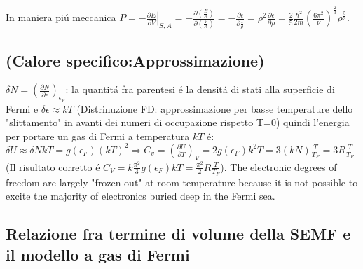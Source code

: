 In maniera pi\'u meccanica $P=-\left.\frac{\partial E}{\partial V} \right|_{S,A}=-\frac{\partial (\frac{E}{A})}{\partial (\frac{V}{A})}=-\frac{\partial \epsilon}{\partial \frac{1}{\rho}}=\rho^2 \frac{\partial \epsilon}{\partial \rho}=\frac{2}{5}\frac{\hbar^2}{2m}(\frac{6\pi^2}{\nu})^{\frac{2}{3}}\rho^\frac{5}{3}$.

\subsection{(Calore specifico:Approssimazione)}
$\delta N=(\frac{\partial N}{\partial \epsilon})_{\epsilon_F}$: la quantit\'a fra parentesi \'e la densit\'a di stati alla superficie di Fermi e $\delta \epsilon \approx kT$ (Distrinuzione FD: approssimazione per basse temperature dello "slittamento" in avanti dei numeri di occupazione rispetto T=0) quindi l'energia per portare un gas di Fermi a temperatura $kT$ \'e: $\delta U\approx \delta NkT=g(\epsilon_F)(kT)^2 \Rightarrow C_v=(\frac{\partial U}{\partial T})_V=2g(\epsilon_F)k^2T=3(kN)\frac{T}{T_F}=3R\frac{T}{T_F}$ (Il risultato corretto \'e $C_V=k\frac{\pi^2}{3}g(\epsilon_F)kT=\frac{\pi^2}{2}R\frac{T}{T_F}$). 
The electronic degrees of freedom are largely "frozen out" at room temperature because it is not possible to excite the majority of electronics buried deep in the Fermi sea.

\subsection{Relazione fra termine di volume della SEMF e il modello a gas di Fermi}

